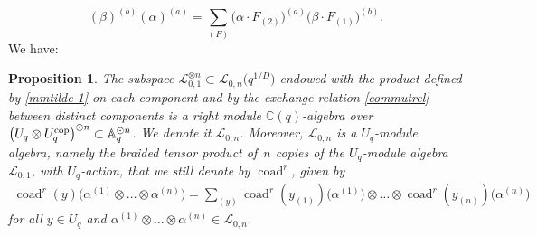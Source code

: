 \documentclass[pdftex]{sigma}%
\numberwithin{equation}{section}
\numberwithin{figure}{section}
\newtheorem{prop}[teo]{Proposition}
\newcommand{\mc}{\mathbb{C}}
\newcommand{\Ll}{{\mathcal L}}
\begin{document}
\begin{equation}\label{commutrel}
(\beta)^{(b)}(\alpha)^{(a)} = \sum_{(F)} \big(\alpha\cdot F_{(2)}\big)^{(a)} \big(\beta\cdot F_{(1)}\big)^{(b)}.
\end{equation}
We have:
\begin{prop}\label{defiL0n} The subspace $\Ll_{0,1}^{\otimes n}\subset \Ll_{0,n}\big(q^{1/D}\big)$ endowed with the product defined by \eqref{mmtilde-1} on each component and by the exchange relation \eqref{commutrel} between distinct components is a right module $\mc(q)$-algebra over $\big(U_q\otimes U_q^{\rm cop}\big)^{\odot n}\subset \mathbb{A}_q^{\odot n}$. We denote it $\Ll_{0,n}$. Moreover, $\Ll_{0,n}$ is a $U_q$-module algebra, namely the braided tensor product of~$n$ copies of the $U_q$-module algebra $\Ll_{0,1}$, with $U_q$-action, that we still denote by $\operatorname{coad}^r$, given by
\begin{gather}
\operatorname{coad}^r(y)\big(\alpha^{(1)}\otimes \dots \otimes \alpha^{(n)}\big) = \sum_{(y)} \operatorname{coad}^r(y_{(1)})\big(\alpha^{(1)}\big) \otimes \dots \otimes \operatorname{coad}^r(y_{(n)})\big(\alpha^{(n)}\big)\label{actionprod}
\end{gather}
for all $y \in U_q$ and $\alpha^{(1)}\otimes \dots \otimes \alpha^{(n)} \in \Ll_{0,n}$.
\end{prop}
\end{document}
